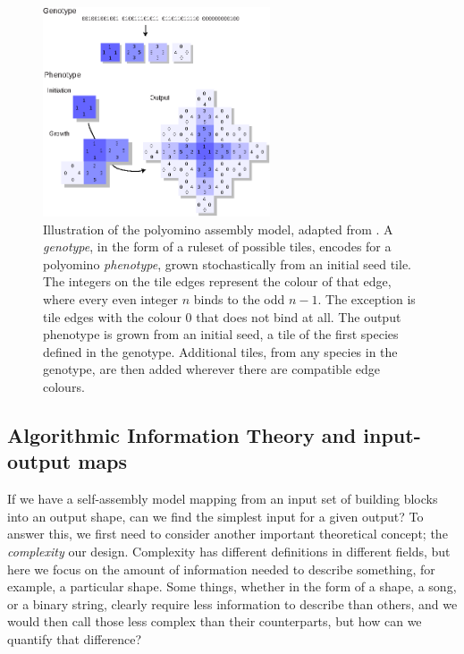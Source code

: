\begin{figure}[ht]
    \centering
    \includegraphics[width=0.6\textwidth]{figures/polyominoes.eps}
    \caption{Illustration of the polyomino assembly model, adapted from \cite{johnston2011evolutionary}. A \emph{genotype}, in the form of a ruleset of possible tiles, encodes for a polyomino \emph{phenotype}, grown stochastically from an initial seed tile. The integers on the tile edges represent the colour of that edge, where every even integer \(n\) binds to the odd \(n-1\). The exception is tile edges with the colour \(0\) that does not bind at all. The output phenotype is grown from an initial seed, a tile of the first species defined in the genotype. Additional tiles, from any species in the genotype, are then added wherever there are compatible edge colours.}
    \label{fig:polyominoes}
\end{figure}

\subsection{Algorithmic Information Theory and input-output maps}
\label{sec:AIT}




If we have a self-assembly model mapping from an input set of building blocks into an output shape, can we find the simplest input for a given output? To answer this, we first need to consider another important theoretical concept; the \emph{complexity} our design. Complexity has different definitions in different fields, but here we focus on the amount of information needed to describe something, for example, a particular shape. Some things, whether in the form of a shape, a song, or a binary string, clearly require less information to describe than others, and we would then call those less complex than their counterparts, but how can we quantify that difference?

